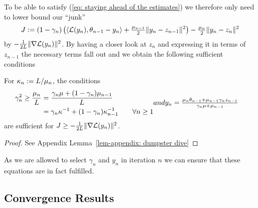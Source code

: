 To be able to satisfy (\ref{eq: staying ahead of the estimates}) we therefore
only need to lower bound our ``junk''
\begin{align*}
	J := (1-\gamma_n)\left(
		\langle \mathcal{L}(y_n), \theta_{n-1} - y_n\rangle
		+ \tfrac{\mu_{n-1}}{2}\|y_n - z_{n-1}\|^2
	\right)
	- \tfrac{\mu_n}{2}\|y_n - z_n\|^2
\end{align*}
by \(- \tfrac{1}{2L}\|\nabla\mathcal{L}(y_n)\|^2\). By having a closer look at
\(z_n\) and expressing it in terms of \(z_{n-1}\) the necessary terms fall out
and we obtain the following sufficient conditions
\begin{lemma}
	For \(\kappa_n := L/\mu_n\), the conditions
	\begin{subequations}
	\begin{align}
		\nonumber
		\gamma_n^2 \ge \frac{\lbound_n}{\ubound}
		&= \frac{\gamma_n \lbound +  (1-\gamma_n)\lbound_{n-1}}{\ubound}\\
		&= \gamma_n \condition^{-1} + (1-\gamma_n)\condition_{n-1}^{-1}
		\qquad \forall n\ge 1
		\label{eq: morphing speed equation}
	\end{align}
	and
	\begin{align}
		y_n
		&= \tfrac{\lbound_n\weights_{n-1} + \lbound_{n-1}\gamma_n z_{n-1}}{\gamma_n\lbound + \lbound_{n-1}}
	\end{align}
	\end{subequations}
	are sufficient for \(J \ge - \tfrac{1}{2L}\|\nabla\mathcal{L}(y_n)\|^2\).
\end{lemma}
\begin{proof}
	See Appendix Lemma~\ref{lem-appendix: dumpster dive}
\end{proof}
As we are allowed to select \(\gamma_n\) and \(y_n\) in iteration \(n\) we
can ensure that these equations are in fact fulfilled.

\subsection{Convergence Results}

